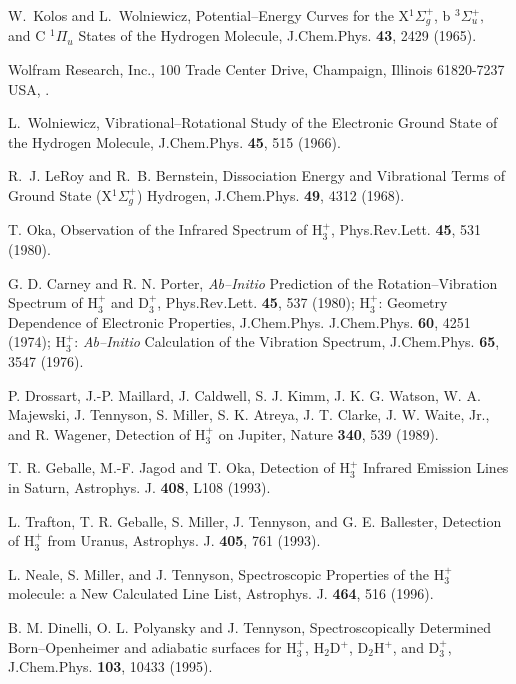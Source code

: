 \begin{thebibliography}{999}
W.~Kolos and L.~Wolniewicz,
Potential--Energy Curves for the X$^{1} \Sigma _g^+$, 
b $^{3}\Sigma_u ^+,$
and C $^{1} \Pi_u$ States of the Hydrogen Molecule,
\newblock J.Chem.Phys. {\bf 43}, 2429 (1965).

Wolfram Research, Inc., 
100 Trade Center Drive, Champaign, Illinois 61820-7237
USA,
.

L.~Wolniewicz,
Vibrational--Rotational Study of the Electronic Ground State 
of the Hydrogen Molecule,
\newblock J.Chem.Phys. {\bf 45}, 515 (1966).

R.~J. Le{R}oy and R.~B. Bernstein,
Dissociation Energy and Vibrational Terms of Ground State 
(X$^{1} \Sigma _g ^+$) Hydrogen,
\newblock  J.Chem.Phys. {\bf 49}, 4312 (1968).


T. Oka, 
Observation of the Infrared Spectrum of H$_3^+$, 
Phys.Rev.Lett. {\bf 45}, 531 (1980).

G. D. Carney and R. N. Porter, 
{\it Ab--Initio} Prediction of the Rotation--Vibration 
Spectrum of H$_3^+$ and D$_3^+$,
Phys.Rev.Lett. {\bf 45}, 537 (1980);
H$_3^+$: Geometry Dependence of Electronic Properties, J.Chem.Phys. 
J.Chem.Phys. {\bf 60}, 4251 (1974);
H$_3^+$: {\it Ab--Initio} Calculation of the Vibration Spectrum,
J.Chem.Phys. {\bf 65}, 3547 (1976).

P. Drossart, J.-P. Maillard, J. Caldwell, S. J. Kimm,
J. K. G. Watson, W. A. Majewski, J. Tennyson, S. Miller, S. K. Atreya,
J. T. Clarke, J. W. Waite, Jr., and R. Wagener, 
Detection of H$_3^+$ on Jupiter,
Nature {\bf 340},
539 (1989).

T. R. Geballe, M.-F. Jagod and T. Oka, 
Detection of H$_3^+$ Infrared Emission Lines
in Saturn,
Astrophys. J. {\bf 408},
L108 (1993).

L. Trafton, T. R. Geballe, S. Miller, J. Tennyson, and
G. E. Ballester, 
Detection of H$_3^+$ from Uranus,
Astrophys. J. {\bf 405}, 761 (1993).

L. Neale, S. Miller, and J. Tennyson, 
Spectroscopic Properties of the H$_3^+$ molecule:
a New Calculated Line List,
Astrophys. J. {\bf 464}, 516
(1996).

B. M. Dinelli, O. L. Polyansky and J. Tennyson, 
Spectroscopically Determined Born--Openheimer and
adiabatic surfaces for 
H$_3^+$, H$_2$D$^+$, D$_2$H$^+$, and D$_3^+$,
J.Chem.Phys. {\bf 103},
10433 (1995).


\end{thebibliography}

